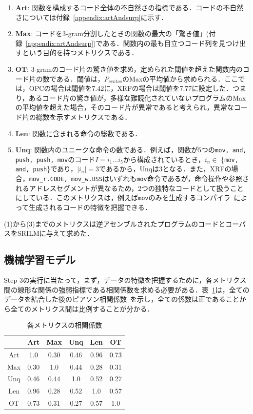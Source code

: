 \documentclass[12pt]{jarticle}
\newcommand\doubleRule{\toprule\toprule}
\begin{document}
\begin{enumerate}
  \item \textbf{Art}: 関数を構成するコード全体の不自然さの指標である．コードの不自然さについては付録~\ref{appendix:artAndsurp}に示す．
  \item \textbf{Max}: コードを3-gram分割したときの関数の最大の「驚き値」(付録~\ref{appendix:artAndsurp})である．関数内の最も目立つコード列を見つけ出すという目的を持つメトリクスである．
  \item \textbf{OT}: 3-gramのコード片の驚き値を求め，定められた閾値を超えた関数内のコード片の数である．閾値は，$P_{centos}$のMaxの平均値から求められる．ここでは，OPCの場合は閾値を7.42に，XRFの場合は閾値を7.77に設定した．つまり，あるコード片の驚き値が，多様な難読化されていないプログラムのMaxの平均値を超えた場合，そのコード片が異常であると考えられ，異常なコード片の総数を示すメトリクスである．
  \item \textbf{Len}: 関数に含まれる命令の総数である．
  \item \textbf{Unq}: 関数内のユニークな命令の数である．例えば，関数が5つの\texttt{mov, and, push, push, mov}のコード$I=i_1...i_5$から構成されているとき，$i_n\in$ \{\texttt{mov, and, push}\}であり，$|i_n|=3$であるから，Unqは3となる．また，XRFの場合，\texttt{mov\_r.CODE, mov\_w.BSS}はいずれも\texttt{mov}命令であるが，命令操作や参照されるアドレスセグメントが異なるため，2つの独特なコードとして扱うことにしている．このメトリクスは，例えば\texttt{mov}のみを生成するコンパイラ~\cite{movfuscator}によって生成されるコードの特徴を把握できる．
\end{enumerate}
(1)から(3)までのメトリクスは逆アセンブルされたプログラムのコードとコーパスをSRILMに与えて求めた．

\subsection{機械学習モデル}
Step 3の実行に当たって，まず，データの特徴を把握するために，各メトリクス間の線形な関係の強弱指標である相関係数を求める必要がある．表~\ref{table:correl}は，全てのデータを結合した後のピアソン相関係数~\cite{pearson}を示し，全ての係数は正であることから全てのメトリクス間は比例することが分かる．

\begin{table}[th]
\centering
\caption{各メトリクスの相関係数}
\label{table:correl}
\begin{tabular}[t]{c|ccccc}
\doubleRule
& Art & Max & Unq & Len & OT \\
\hline
Art & 1.0  & 0.30 & 0.46 & 0.96 & 0.73 \\
Max & 0.30 & 1.0  & 0.44 & 0.28 & 0.31 \\
Unq & 0.46 & 0.44 & 1.0  & 0.52 & 0.27 \\
Len & 0.96 & 0.28 & 0.52 & 1.0  & 0.57 \\
OT  & 0.73 & 0.31 & 0.27 & 0.57 & 1.0  \\
\bottomrule
\end{tabular}
\end{table}
\end{document}
